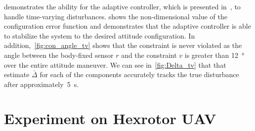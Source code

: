  demonstrates the ability for the adaptive controller, which is presented in~, to handle time-varying disturbances.
 shows the non-dimensional value of the configuration error function and demonstrates that the adaptive controller is able to stabilize the system to the desired attitude configuration.
In addition,~\cref{fig:con_angle_tv} shows that the constraint is never violated as the angle between the body-fixed sensor \( r \) and the constraint \( v \) is greater than \SI{12}{\degree} over the entire attitude maneuver.
We can see in~\cref{fig:Delta_tv} that that estimate \(\bar \Delta \) for each of the components accurately tracks the true disturbance after approximately~\SI{5}{\second}.

\section{Experiment on Hexrotor UAV}\label{sec:experiment}


